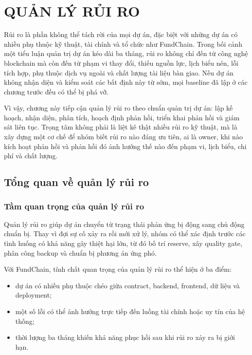 \chapter{QUẢN LÝ RỦI RO}

Rủi ro là phần không thể tách rời của mọi dự án, đặc biệt với những dự án có nhiều phụ thuộc kỹ thuật, tài chính và tổ chức như FundChain. Trong bối cảnh một tiểu luận quản trị dự án kéo dài ba tháng, rủi ro không chỉ đến từ công nghệ blockchain mà còn đến từ phạm vi thay đổi, thiếu nguồn lực, lịch biểu nén, lỗi tích hợp, phụ thuộc dịch vụ ngoài và chất lượng tài liệu bàn giao. Nếu dự án không nhận diện và kiểm soát các bất định này từ sớm, mọi baseline đã lập ở các chương trước đều có thể bị phá vỡ.

Vì vậy, chương này tiếp cận quản lý rủi ro theo chuẩn quản trị dự án: lập kế hoạch, nhận diện, phân tích, hoạch định phản hồi, triển khai phản hồi và giám sát liên tục. Trọng tâm không phải là liệt kê thật nhiều rủi ro kỹ thuật, mà là xây dựng một cơ chế để nhóm biết rủi ro nào đáng ưu tiên, ai là owner, khi nào kích hoạt phản hồi và phản hồi đó ảnh hưởng thế nào đến phạm vi, lịch biểu, chi phí và chất lượng.

\iffalse
\section{Tổng quan về quản lý rủi ro}

\subsection{Tầm quan trọng của quản lý rủi ro}

Quản lý rủi ro giúp dự án chuyển từ trạng thái phản ứng bị động sang chủ động chuẩn bị. Thay vì đợi sự cố xảy ra rồi mới xử lý, nhóm có thể xác định trước các tình huống có khả năng gây thiệt hại lớn, từ đó bố trí reserve, xây quality gate, phân công backup và chuẩn bị phương án ứng phó.

Với FundChain, tính chất quan trọng của quản lý rủi ro thể hiện ở ba điểm:

\begin{itemize}
  \item dự án có nhiều phụ thuộc chéo giữa contract, backend, frontend, dữ liệu và deployment;
  \item một số lỗi có thể ảnh hưởng trực tiếp đến luồng tài chính hoặc uy tín của hệ thống;
  \item thời lượng ba tháng khiến khả năng phục hồi sau khi rủi ro xảy ra bị giới hạn.
\end{itemize}


